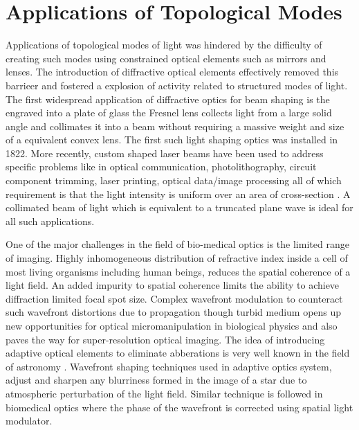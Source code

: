 


\section{Applications of Topological Modes}

Applications of topological modes of light was hindered by the difficulty of creating such modes using constrained optical elements such as mirrors and lenses. The introduction of diffractive optical elements effectively removed this barrieer and fostered a explosion of activity related to structured modes of light. The first widespread application of diffractive optics for beam shaping is the engraved into a plate of glass the Fresnel lens collects light from a large solid angle and collimates it into a beam without requiring a massive weight and size of a equivalent convex lens. The first such light shaping optics was installed in 1822. More recently, custom shaped laser beams have been used to address specific problems like in optical communication, photolithography, circuit component trimming, laser printing, optical data/image processing all of which requirement is that the light intensity is uniform over an area of cross-section \cite{Dickey03}. A collimated beam of light which is equivalent to a truncated plane wave is ideal for all such applications. 

One of the major challenges in the field of bio-medical optics is the limited range of imaging. Highly inhomogeneous distribution of refractive index inside a cell of most living organisms including human beings, reduces the spatial coherence of a light field. An added impurity to spatial coherence limits the ability to achieve diffraction limited focal spot size. Complex wavefront modulation to counteract such wavefront distortions due to propagation though turbid medium opens up new opportunities for optical micromanipulation in biological physics and also paves the way for super-resolution optical imaging. The idea of introducing adaptive optical elements to eliminate abberations is very well known in the field of astronomy \cite{Beuzit1997, beuzit1994}. Wavefront shaping techniques used in adaptive optics system, adjust and sharpen any blurriness formed in the image of a star due to atmospheric perturbation of the light field. Similar technique is followed in biomedical optics where the phase of the wavefront is corrected using spatial light modulator.

